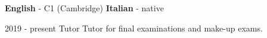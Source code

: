 \documentclass[9pt]{developercv} %
\begin{document}

\vspace{-10 pt}
    \vspace{-6pt}
    
    \hspace{26mm} \textbf{English} - C1 (Cambridge) \; \textbf{ Italian} - native

\vspace{-10 pt}
\begin{entrylist}

	\entry
	{2019 - present}
	{Tutor}
	{}
	{Tutor for final examinations and make-up exams.}

\end{entrylist}
\end{document}
